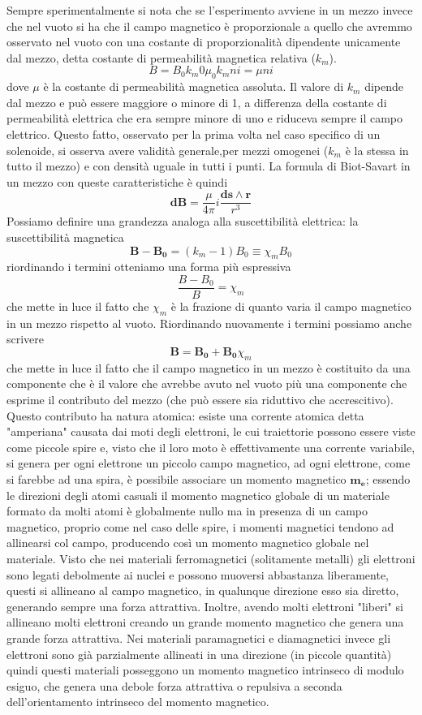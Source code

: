 \documentclass[10pt,a4paper]{article}
\begin{document}
Sempre sperimentalmente si nota che se l'esperimento avviene in un mezzo invece che nel vuoto si ha che il campo magnetico è proporzionale a quello che avremmo osservato nel vuoto con una costante di proporzionalità dipendente unicamente dal mezzo, detta costante di permeabilità magnetica relativa (\(k_m\)).
\[B = B_0 k_m 0 \mu_0 k_m n i = \mu n i\]
dove $\mu$ è la costante di permeabilità magnetica assoluta. 
Il valore di \(k_m\) dipende dal mezzo e può essere maggiore o minore di 1, a differenza della costante di permeabilità elettrica che era sempre minore di uno e riduceva sempre il campo elettrico. Questo fatto, osservato per la prima volta nel caso specifico di un solenoide, si osserva avere validità generale,per mezzi omogenei (\(k_m\) è la stessa in tutto il mezzo) e con densità uguale in tutti i punti. La formula di Biot-Savart in un mezzo con queste caratteristiche è quindi 
\[\mathbf{dB} = \frac{\mu}{4\pi} i \frac{\mathbf{ds}\wedge \mathbf{r}}{r^3}\] 
Possiamo definire una grandezza analoga alla suscettibilità elettrica: la suscettibilità magnetica 
\[\mathbf{B}-\mathbf{B_0}=(k_m - 1)B_0 \equiv \chi_m B_0\]
riordinando i termini otteniamo una forma più espressiva
\[\frac{B-B_0}{B}=\chi_m\]
che mette in luce il fatto che $\chi_m$ è la frazione di quanto varia il campo magnetico in un mezzo rispetto al vuoto. Riordinando nuovamente i termini possiamo anche scrivere
\[\mathbf{B}=\mathbf{B_0}+\mathbf{B_0}\chi_m\]
che mette in luce il fatto che il campo magnetico in un mezzo è costituito da una componente che è il valore che avrebbe avuto nel vuoto più una componente che esprime il contributo del mezzo (che può essere sia riduttivo che accrescitivo). Questo contributo ha natura atomica: esiste una corrente atomica detta "amperiana" causata dai moti degli elettroni, le cui traiettorie possono essere viste come piccole spire e, visto che il loro moto è effettivamente una corrente variabile, si genera per ogni elettrone un piccolo campo magnetico, ad ogni elettrone, come si farebbe ad una spira, è possibile associare un momento magnetico \(\mathbf{m_e}\); essendo le direzioni degli atomi casuali il momento magnetico globale di un materiale formato da molti atomi è globalmente nullo ma in presenza di un campo magnetico, proprio come nel caso delle spire, i momenti magnetici tendono ad allinearsi col campo, producendo così un momento magnetico globale nel materiale. Visto che nei materiali ferromagnetici (solitamente metalli) gli elettroni sono legati debolmente ai nuclei e possono muoversi abbastanza liberamente, questi si allineano al campo magnetico, in qualunque direzione esso sia diretto, generando sempre una forza attrattiva. Inoltre, avendo molti elettroni "liberi" si allineano molti elettroni creando un grande momento magnetico che genera una grande forza attrattiva. Nei materiali paramagnetici e diamagnetici invece gli elettroni sono già parzialmente allineati in una direzione (in piccole quantità) quindi questi materiali posseggono un momento magnetico intrinseco di modulo esiguo, che genera una debole forza attrattiva o repulsiva a seconda dell'orientamento intrinseco del momento magnetico.\\
\end{document}
